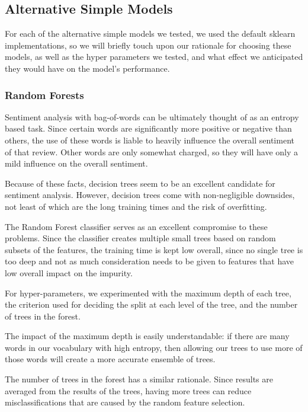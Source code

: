 \documentclass[conference]{IEEEtran}
\begin{document}

\subsection{Alternative Simple Models}

For each of the alternative simple models we tested, we used the default sklearn implementations, so we will briefly touch upon our rationale for choosing these models, as well as the hyper parameters we tested, and what effect we anticipated they would have on the model's performance.

\subsubsection{Random Forests}

Sentiment analysis with bag-of-words can be ultimately thought of as an entropy based task. Since certain words are significantly more positive or negative than others, the use of these words is liable to heavily influence the overall sentiment of that review. Other words are only somewhat charged, so they will have only a mild influence on the overall sentiment.

Because of these facts, decision trees seem to be an excellent candidate for sentiment analysis. However, decision trees come with non-negligible downsides, not least of which are the long training times and the risk of overfitting.

The Random Forest classifier serves as an excellent compromise to these problems. Since the classifier creates multiple small trees based on random subsets of the features, the training time is kept low overall, since no single tree is too deep and not as much consideration needs to be given to features that have low overall impact on the impurity.

For hyper-parameters, we experimented with the maximum depth of each tree, the criterion used for deciding the split at each level of the tree, and the number of trees in the forest.

The impact of the maximum depth is easily understandable: if there are many words in our vocabulary with high entropy, then allowing our trees to use more of those words will create a more accurate ensemble of trees.

The number of trees in the forest has a similar rationale. Since results are averaged from the results of the trees, having more trees can reduce misclassifications that are caused by the random feature selection.
\end{document}
